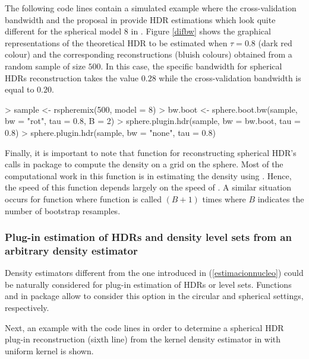 The following code lines contain a simulated example where the cross-validation bandwidth and the proposal in \cite{saavedra2020nonparametric} provide HDR estimations which look quite different for the spherical model $8$ in . Figure \ref{difbw} shows the graphical representations of the theoretical HDR to be estimated when $\tau=0.8$ (dark red colour) and the corresponding reconstructions (bluish colours) obtained from a random sample of size $500$. In this case, the specific bandwidth for spherical HDRs reconstruction takes the value $0.28$ while the cross-validation bandwidth is equal to $0.20$.  
\begin{example}
> sample <- rspheremix(500, model = 8) 
> bw.boot <- sphere.boot.bw(sample, bw = "rot", tau = 0.8, B = 2) 
> sphere.plugin.hdr(sample, bw = bw.boot, tau = 0.8) 
> sphere.plugin.hdr(sample, bw = "none", tau = 0.8)
\end{example}
Finally, it is important to note that function  for reconstructing spherical HDR's calls  in package  to compute the density on a grid on the sphere. Most of the computational work in this function is in estimating the density using . Hence, the speed of this function depends largely on the speed of . A similar situation occurs for function  where function  is called $(B+1)$ times where $B$ indicates the number of bootstrap resamples.



\subsubsection{Plug-in estimation of HDRs and density level sets from an arbitrary density estimator}

Density estimators different from the one introduced in  (\ref{estimacionnucleo}) could be naturally considered for plug-in estimation of HDRs or level sets. Functions  and  in package  allow to consider this option in the circular and spherical settings, respectively.  

Next, an example with the code lines in order to determine a spherical HDR plug-in reconstruction (sixth line) from the kernel density estimator in \cite{bai1989kernel} with uniform kernel is shown.

